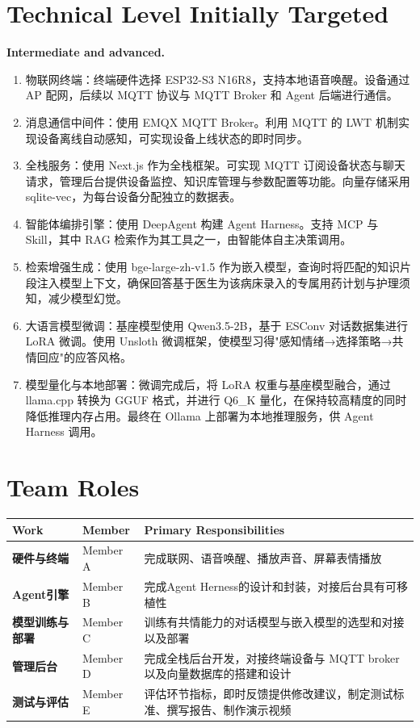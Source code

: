 \documentclass[11pt,a4paper]{article}
\begin{document}
\section{Technical Level Initially Targeted}
\textbf{Intermediate and advanced.}
\begin{enumerate}[leftmargin=*,itemsep=1pt,topsep=2pt]
    \item 物联网终端：终端硬件选择 ESP32-S3 N16R8，支持本地语音唤醒。设备通过 AP 配网，后续以 MQTT 协议与 MQTT Broker 和 Agent 后端进行通信。
    \item 消息通信中间件：使用 EMQX MQTT Broker。利用 MQTT 的 LWT 机制实现设备离线自动感知，可实现设备上线状态的即时同步。
    \item 全栈服务：使用 Next.js 作为全栈框架。可实现 MQTT 订阅设备状态与聊天请求，管理后台提供设备监控、知识库管理与参数配置等功能。向量存储采用 sqlite-vec，为每台设备分配独立的数据表。
    \item 智能体编排引擎：使用 DeepAgent 构建 Agent Harness。支持 MCP 与 Skill，其中 RAG 检索作为其工具之一，由智能体自主决策调用。
    \item 检索增强生成：使用 bge-large-zh-v1.5 作为嵌入模型，查询时将匹配的知识片段注入模型上下文，确保回答基于医生为该病床录入的专属用药计划与护理须知，减少模型幻觉。
    \item 大语言模型微调：基座模型使用 Qwen3.5-2B，基于 ESConv 对话数据集进行 LoRA 微调。使用 Unsloth 微调框架，使模型习得"感知情绪→选择策略→共情回应"的应答风格。
    \item 模型量化与本地部署：微调完成后，将 LoRA 权重与基座模型融合，通过 llama.cpp 转换为 GGUF 格式，并进行 Q6\_K 量化，在保持较高精度的同时降低推理内存占用。最终在 Ollama 上部署为本地推理服务，供 Agent Harness 调用。
\end{enumerate}

\section{Team Roles}
\begin{table}[h]
\centering
\renewcommand{\arraystretch}{1.6}
\begin{tabularx}{\textwidth}{|>{\bfseries}p{5cm}|p{2.2cm}|X|}
\hline
\rowcolor{midgray}
Work & Member & Primary Responsibilities \\
\hline
硬件与终端 & Member A & 完成联网、语音唤醒、播放声音、屏幕表情播放 \\
\hline
Agent引擎 & Member B & 完成Agent Herness的设计和封装，对接后台具有可移植性 \\
\hline
模型训练与部署 & Member C & 训练有共情能力的对话模型与嵌入模型的选型和对接以及部署 \\
\hline
管理后台 & Member D & 完成全栈后台开发，对接终端设备与 MQTT broker 以及向量数据库的搭建和设计\\
\hline
测试与评估 & Member E & 评估环节指标，即时反馈提供修改建议，制定测试标准、撰写报告、制作演示视频 \\
\hline
\end{tabularx}
\end{table}
\vspace{-6pt}
{\footnotesize\textit{}}
\end{document}
